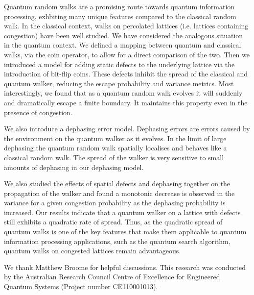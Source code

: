 \documentclass[aps,pra,twocolumn,amsmath,amssymb,nofootinbib,superscriptaddress]{revtex4}
\begin{document}
Quantum random walks are a promising route towards quantum information processing, exhbiting many unique features compared to the classical random walk. In the classical context, walks on percolated lattices (i.e. lattices containing congestion) have been well studied. We have considered the analogous situation in the quantum context. We defined a mapping between quantum and classical walks, via the coin operator, to allow for a direct comparison of the two. Then we introduced a model for adding static defects to the underlying lattice via the introduction of bit-flip coins. These defects inhibit the spread of the classical and quantum walker, reducing the escape probability and variance metrics. Most interestingly, we found that as a quantum random walk evolves it will suddenly and dramatically escape a finite boundary. It maintains this property even in the presence of congestion.

We also introduce a dephasing error model. Dephasing errors are errors caused by the environment on the quantum walker as it evolves. In the limit of large dephasing the quantum random walk spatially localises and behaves like a classical random walk. The spread of the walker is very sensitive to small amounts of dephasing in our dephasing model.
 
We also studied the effects of spatial defects and dephasing together on the propagation of the walker and found a monotonic decrease is observed in the variance for a given congestion probability as the dephasing probability is increased. Our results indicate that a quantum walker on a lattice with defects still exhibits a quadratic rate of spread. Thus, as the quadratic spread of quantum walks is one of the key features that make them applicable to quantum information processing applications, such as the quantum search algorithm, quantum walks on congested lattices remain advantageous. 

\singlespacing
\begin{acknowledgments}
We thank Matthew Broome for helpful discussions. This research was conducted by the Australian Research Council Centre of Excellence for Engineered Quantum Systems (Project number CE110001013). 
\end{acknowledgments}


\end{document}
